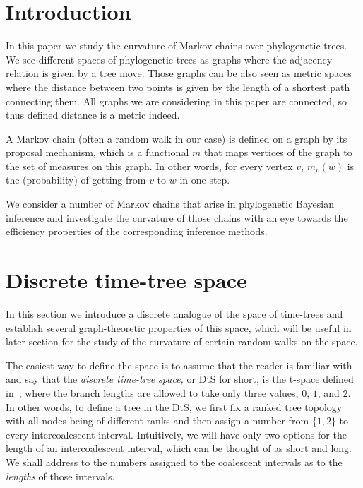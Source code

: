 \documentclass{amsart}
\newcommand{\dts}{\mathrm{DtS}}
\begin{document}
\section{Introduction}

In this paper we study the curvature of Markov chains over phylogenetic trees. 
We see different spaces of phylogenetic trees as graphs where the adjacency 
relation is given by a tree move. Those graphs can be also seen as metric 
spaces where the distance between two points is given by the length of a
shortest path connecting them. All graphs we are considering in this paper are
connected, so thus defined distance is a metric indeed. 

A Markov chain (often a random walk in our case) is defined on a graph by its
proposal mechanism, which is a functional $m$ that maps vertices of the graph to
the set of measures on this graph. In other words, for every vertex $v$, 
$m_v(w)$ is the (probability) of getting from $v$ to $w$ in one step. 

We consider a number of Markov chains that arise 
in phylogenetic Bayesian 
inference and investigate the curvature of those chains with an eye towards 
the efficiency properties of the corresponding inference methods. 

\section{Discrete time-tree space}

In this section we introduce a discrete analogue of the space of time-trees
and establish several graph-theoretic properties of this space, which will
be useful in later section for the study of the curvature of certain random
walks on the space. 

The easiest way to define the space is to assume that the reader is familiar 
with~\cite{Gavryushkin2014-bw} and say that the 
{\em discrete time-tree space,}
or $\dts$ for short, is the $\mathrm t$-space defined 
in~\cite{Gavryushkin2014-bw}, where the
branch lengths are allowed to take only three values, $0$, $1$, and $2$. 
In other words, to define a tree in the $\dts$, we first fix a ranked tree 
topology with all nodes being of different ranks and then assign a number
from $\{1,2\}$ to every intercoalescent interval. Intuitively, we will have
only two options for the length of an intercoalescent interval, which can
be thought of as short 
and long. 
We shall address to the numbers assigned to the coalescent intervals as to
the {\em lengths} of those intervals. 
\end{document}

